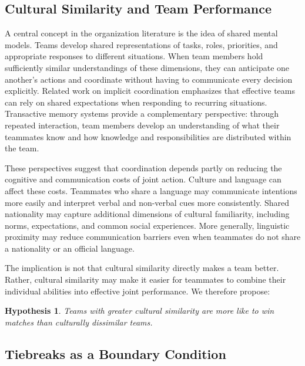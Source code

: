 \documentclass[10pt]{article}
\newtheorem{hypothesis}{Hypothesis}
\begin{document}
\subsection{Cultural Similarity and Team Performance}
A central concept in the organization literature is the idea of shared mental models. Teams develop shared representations of tasks, roles, priorities, and appropriate responses to different situations. When team members hold sufficiently similar understandings of these dimensions, they can anticipate one another's actions and coordinate without having to communicate every decision explicitly. Related work on implicit coordination emphasizes that effective teams can rely on shared expectations when responding to recurring situations. Transactive memory systems provide a complementary perspective: through repeated interaction, team members develop an understanding of what their teammates know and how knowledge and responsibilities are distributed within the team.

These perspectives suggest that coordination depends partly on reducing the cognitive and communication costs of joint action. Culture and language can affect these costs. Teammates who share a language may communicate intentions more easily and interpret verbal and non-verbal cues more consistently. Shared nationality may capture additional dimensions of cultural familiarity, including norms, expectations, and common social experiences. More generally, linguistic proximity may reduce communication barriers even when teammates do not share a nationality or an official language.

The implication is not that cultural similarity directly makes a team better. Rather, cultural similarity may make it easier for teammates to combine their individual abilities into effective joint performance. %
We therefore propose:
\begin{hypothesis}
 Teams with greater cultural similarity are more like to win matches  than culturally dissimilar teams.
\end{hypothesis}
\subsection{Tiebreaks as a Boundary Condition}

\end{document}
